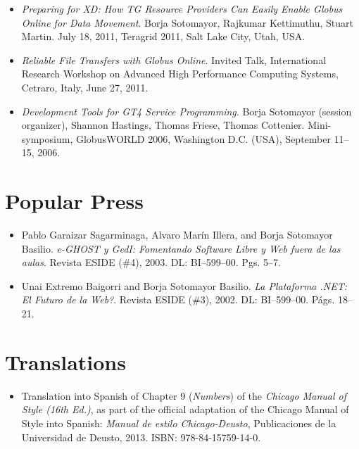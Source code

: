 \documentclass[11pt,letterpaper,sans]{moderncv}
\begin{document}
\begin{itemize}
\item \emph{Preparing for XD: How TG Resource Providers Can Easily Enable Globus Online for Data Movement}. Borja Sotomayor, Rajkumar Kettimuthu, Stuart Martin. July 18, 2011, Teragrid 2011, Salt Lake City, Utah, USA.
\item \emph{Reliable File Transfers with Globus Online}. Invited Talk, International Research Workshop on Advanced High Performance Computing Systems, Cetraro, Italy, June 27, 2011.
\item \emph{Development Tools for GT4 Service Programming}. Borja Sotomayor (session organizer), Shannon Hastings, Thomas Friese, Thomas Cottenier. Mini-symposium, GlobusWORLD 2006, Washington D.C. (USA), September 11--15, 2006.
\end{itemize}

\section{Popular Press}

\begin{itemize}
\item Pablo Garaizar Sagarminaga, Alvaro Mar\'in Illera, and Borja Sotomayor Basilio. \emph{e-GHOST y GedI: Fomentando Software Libre y Web fuera de las aulas}. Revista ESIDE (\#4), 2003. DL: BI--599--00. Pgs. 5--7.
\item Unai Extremo Baigorri and Borja Sotomayor Basilio. \emph{La Plataforma .NET: \textquestiondown El Futuro de la Web?}. Revista ESIDE (\#3), 2002. DL: BI--599--00. P\'ags. 18--21.
\end{itemize}

\section{Translations}

\begin{itemize}
\item Translation into Spanish of Chapter 9 (\emph{Numbers}) of the \emph{Chicago Manual of Style (16th Ed.)}, as part of the official adaptation of the Chicago Manual of Style into Spanish: \emph{Manual de estilo Chicago-Deusto}, Publicaciones de la Universidad de Deusto, 2013. ISBN: 978-84-15759-14-0.
\end{itemize}
\end{document}
